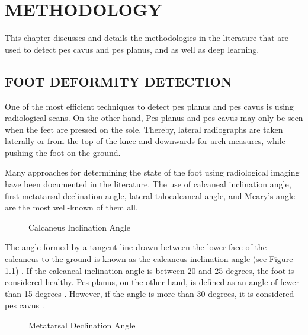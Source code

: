 \chapter{METHODOLOGY}\label{chp:Methodology}

This chapter discusses and details the methodologies in the literature that are used to detect pes cavus and pes planus, and as well as deep learning.

\section{FOOT DEFORMITY DETECTION} \label{sec:MethodologyFootDeformityDetection}

One of the most efficient techniques to detect pes planus and pes cavus is using radiological scans. On the other hand, Pes planus and pes cavus may only be seen when the feet are pressed on the sole. Thereby, lateral radiographs are taken laterally or from the top of the knee and downwards for arch measures, while pushing the foot on the ground.

Many approaches for determining the state of the foot using radiological imaging have been documented in the literature. The use of calcaneal inclination angle, first metatarsal declination angle, lateral talocalcaneal angle, and Meary's angle are the most well-known of them all.

\begin{figure}[htbp]
\centering
{}
\caption{Calcaneus Inclination Angle \cite{deniz2014ccocuklardaki}}
\label{fig:MethodologyCalcaneusInclinationAngle}
\end{figure}

The angle formed by a tangent line drawn between the lower face of the calcaneus to the ground is known as the calcaneus inclination angle (see Figure \ref{fig:MethodologyCalcaneusInclinationAngle}) \cite{deniz2014ccocuklardaki}. If the calcaneal inclination angle is between 20 and 25 degrees, the foot is considered healthy. Pes planus, on the other hand, is defined as an angle of fewer than 15 degrees \cite{flores2019adult}. However, if the angle is more than 30 degrees, it is considered pes cavus \cite{yates2009merriman}.

\begin{figure}[htbp]
\centering
{}
\caption{Metatarsal Declination Angle \cite{davies2012imaging}}
\label{fig:MethodologyMetatarsalDeclinationAngle}
\end{figure}

